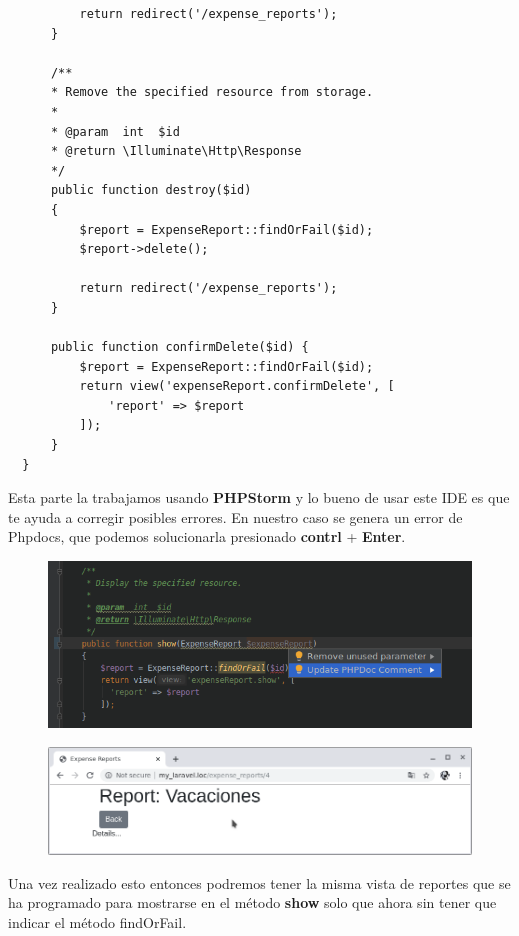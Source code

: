 \documentclass{article}
\begin{document}
\begin{verbatim}
          return redirect('/expense_reports');
      }

      /**
      * Remove the specified resource from storage.
      *
      * @param  int  $id
      * @return \Illuminate\Http\Response
      */
      public function destroy($id)
      {
          $report = ExpenseReport::findOrFail($id);
          $report->delete();

          return redirect('/expense_reports');
      }

      public function confirmDelete($id) {
          $report = ExpenseReport::findOrFail($id);
          return view('expenseReport.confirmDelete', [
              'report' => $report
          ]);
      }
  }
\end{verbatim}

\newpage

Esta parte la trabajamos usando \textbf{PHPStorm} y lo bueno de usar este IDE
es que te ayuda a corregir posibles errores. En nuestro caso se genera un error
de Phpdocs, que podemos solucionarla presionado \textbf{contrl} +
\textbf{Enter}.

\begin{figure}[h!]
  \centering
  \includegraphics[scale=0.75]{./Pictures/098_update_phpdoc.png}
\end{figure}


\begin{figure}[h!]
  \centering
  \includegraphics[scale=0.5]{./Pictures/099_expense_reports.png}
\end{figure}

Una vez realizado esto entonces podremos tener la misma vista de reportes que
se ha programado para mostrarse en el método \textbf{show} solo que ahora sin
tener que indicar el método findOrFail.\\
\end{document}
